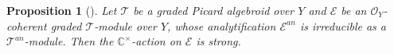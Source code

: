 \documentclass[12pt]{amsart}
\newcommand{\C}{\mathbb{C}}
\newcommand{\Z}{\mathbb{Z}}
\newcommand{\R}{\mathbb{R}}
\newcommand{\TT}{\mathscr{T}}
\newcommand{\cm}{\C^\times}
\newcommand{\OO}{\mathcal{O}}
\newcommand{\EE}{\mathcal{E}}
\newtheorem{Prop}[Thm]{Proposition}
\theoremstyle{definition}
\numberwithin{equation}{section}
\begin{document}
\begin{Prop}[{\cite[Prop. 6.11]{Yu}}] \label{prop:irred_strongness}
	Let $\TT$ be a graded Picard algebroid over $Y$ and $\EE$ be an $\OO_Y$-coherent graded $\TT$-module over $Y$, whose analytification $\EE^{an}$ is irreducible as a $\TT^{an}$-module. Then the $\cm$-action on $\EE$ is strong.
\end{Prop}

\end{document}
